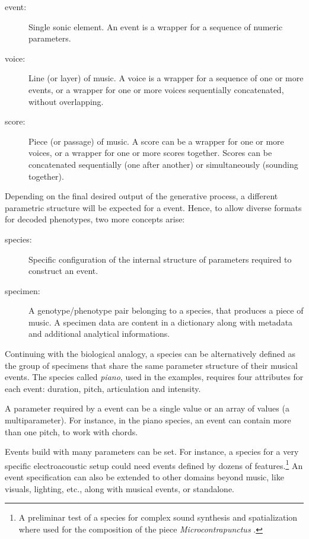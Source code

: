 \documentclass{article}
\begin{document}
\begin{description}
\item[event:] Single sonic element. An event is a wrapper for a sequence of numeric parameters.
\item[voice:] Line (or layer) of music. A voice is a wrapper for a sequence of one or more events, or a wrapper for one or more voices sequentially concatenated, without overlapping.
\item[score:] Piece (or passage) of music. A score can be a wrapper for one or more voices, or a wrapper for one or more scores together. Scores can be concatenated sequentially (one after another) or simultaneously (sounding together).
\end{description}

Depending on the final desired output of the generative process, a different parametric structure will be expected for a event. Hence, to allow diverse formats for decoded phenotypes, two more concepts arise:  

\begin{description}
\item[species:] Specific configuration of the internal structure of parameters required to construct an event.
\item[specimen:] A genotype/phenotype pair belonging to a species, that produces a piece of music. A specimen data are content in a dictionary along with metadata and additional analytical informations.
\end{description}


Continuing with the biological analogy, a {species} can be alternatively defined as the group of specimens that share the same parameter structure of their musical events. The species called \emph{piano}, used in the examples, requires four attributes for each event: duration, pitch, articulation and intensity. 

A {parameter} required by a event can be a single value or an array of values (a {multiparameter}). For instance, in the piano species, an event can contain more than one pitch, to work with chords.

Events build with many parameters can be set. For instance, a species for a very specific electroacoustic setup could need events defined by dozens of features.\footnote{A preliminar test of a species for complex sound synthesis and spatialization where used for the composition of the piece \emph{Microcontrapunctus} \cite{microcontrapunctus}.} An event specification can also be extended to other domains beyond music, like visuals, lighting, etc., along with musical events, or standalone. 
\end{document}
